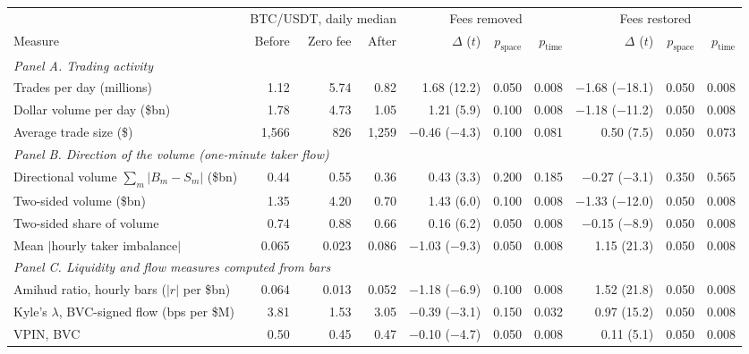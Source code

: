 \begin{tabular}{lrrrrrrrrr}
\toprule
 & \multicolumn{3}{c}{BTC/USDT, daily median} & \multicolumn{3}{c}{Fees removed} & \multicolumn{3}{c}{Fees restored}\\
\cmidrule(lr){2-4}\cmidrule(lr){5-7}\cmidrule(lr){8-10}Measure & Before & Zero fee & After & $\Delta$ ($t$) & $p_{\text{space}}$ & $p_{\text{time}}$ & $\Delta$ ($t$) & $p_{\text{space}}$ & $p_{\text{time}}$\\
\midrule
\multicolumn{10}{l}{\emph{Panel A. Trading activity}}\\
Trades per day (millions) & 1.12 & 5.74 & 0.82 & 1.68 (12.2) & 0.050 & 0.008 & \ensuremath{-}1.68 (\ensuremath{-}18.1) & 0.050 & 0.008\\
Dollar volume per day (\$bn) & 1.78 & 4.73 & 1.05 & 1.21 (5.9) & 0.100 & 0.008 & \ensuremath{-}1.18 (\ensuremath{-}11.2) & 0.050 & 0.008\\
Average trade size (\$) & 1,566 & 826 & 1,259 & \ensuremath{-}0.46 (\ensuremath{-}4.3) & 0.100 & 0.081 & 0.50 (7.5) & 0.050 & 0.073\\
\multicolumn{10}{l}{\emph{Panel B. Direction of the volume (one-minute taker flow)}}\\
Directional volume $\sum_m|B_m-S_m|$ (\$bn) & 0.44 & 0.55 & 0.36 & 0.43 (3.3) & 0.200 & 0.185 & \ensuremath{-}0.27 (\ensuremath{-}3.1) & 0.350 & 0.565\\
Two-sided volume (\$bn) & 1.35 & 4.20 & 0.70 & 1.43 (6.0) & 0.100 & 0.008 & \ensuremath{-}1.33 (\ensuremath{-}12.0) & 0.050 & 0.008\\
Two-sided share of volume & 0.74 & 0.88 & 0.66 & 0.16 (6.2) & 0.050 & 0.008 & \ensuremath{-}0.15 (\ensuremath{-}8.9) & 0.050 & 0.008\\
Mean $|$hourly taker imbalance$|$ & 0.065 & 0.023 & 0.086 & \ensuremath{-}1.03 (\ensuremath{-}9.3) & 0.050 & 0.008 & 1.15 (21.3) & 0.050 & 0.008\\
\multicolumn{10}{l}{\emph{Panel C. Liquidity and flow measures computed from bars}}\\
Amihud ratio, hourly bars ($|r|$ per \$bn) & 0.064 & 0.013 & 0.052 & \ensuremath{-}1.18 (\ensuremath{-}6.9) & 0.100 & 0.008 & 1.52 (21.8) & 0.050 & 0.008\\
Kyle's $\lambda$, BVC-signed flow (bps per \$M) & 3.81 & 1.53 & 3.05 & \ensuremath{-}0.39 (\ensuremath{-}3.1) & 0.150 & 0.032 & 0.97 (15.2) & 0.050 & 0.008\\
VPIN, BVC & 0.50 & 0.45 & 0.47 & \ensuremath{-}0.10 (\ensuremath{-}4.7) & 0.050 & 0.008 & 0.11 (5.1) & 0.050 & 0.008\\

\end{tabular}
